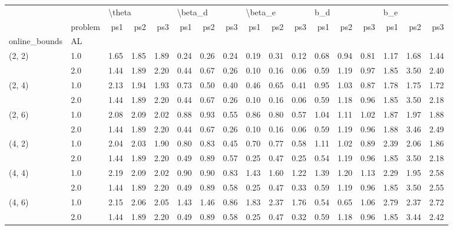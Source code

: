 \begin{tabular}{llrrrrrrrrrrrrrrr}
\toprule
       & {} & \multicolumn{3}{l}{\textbackslash theta} & \multicolumn{3}{l}{\textbackslash beta\_d} & \multicolumn{3}{l}{\textbackslash beta\_e} & \multicolumn{3}{l}{b\_d} & \multicolumn{3}{l}{b\_e} \\
       & problem &    ps1 &  ps2 &  ps3 &     ps1 &  ps2 &  ps3 &     ps1 &  ps2 &  ps3 &  ps1 &  ps2 &  ps3 &  ps1 &  ps2 &  ps3 \\
online\_bounds & AL &        &      &      &         &      &      &         &      &      &      &      &      &      &      &      \\
\midrule
(2, 2) & 1.0 &   1.65 & 1.85 & 1.89 &    0.24 & 0.26 & 0.24 &    0.19 & 0.31 & 0.12 & 0.68 & 0.94 & 0.81 & 1.17 & 1.68 & 1.44 \\
       & 2.0 &   1.44 & 1.89 & 2.20 &    0.44 & 0.67 & 0.26 &    0.10 & 0.16 & 0.06 & 0.59 & 1.19 & 0.97 & 1.85 & 3.50 & 2.40 \\
(2, 4) & 1.0 &   2.13 & 1.94 & 1.93 &    0.73 & 0.50 & 0.40 &    0.46 & 0.65 & 0.41 & 0.95 & 1.03 & 0.87 & 1.78 & 1.75 & 1.72 \\
       & 2.0 &   1.44 & 1.89 & 2.20 &    0.44 & 0.67 & 0.26 &    0.10 & 0.16 & 0.06 & 0.59 & 1.18 & 0.96 & 1.85 & 3.50 & 2.18 \\
(2, 6) & 1.0 &   2.08 & 2.09 & 2.02 &    0.88 & 0.93 & 0.55 &    0.86 & 0.80 & 0.57 & 1.04 & 1.11 & 1.02 & 1.87 & 1.97 & 1.88 \\
       & 2.0 &   1.44 & 1.89 & 2.20 &    0.44 & 0.67 & 0.26 &    0.10 & 0.16 & 0.06 & 0.59 & 1.19 & 0.96 & 1.88 & 3.46 & 2.49 \\
(4, 2) & 1.0 &   2.04 & 2.03 & 1.90 &    0.80 & 0.83 & 0.45 &    0.70 & 0.77 & 0.58 & 1.11 & 1.02 & 0.89 & 2.39 & 2.06 & 1.86 \\
       & 2.0 &   1.44 & 1.89 & 2.20 &    0.49 & 0.89 & 0.57 &    0.25 & 0.47 & 0.25 & 0.54 & 1.19 & 0.96 & 1.85 & 3.50 & 2.18 \\
(4, 4) & 1.0 &   2.19 & 2.09 & 2.02 &    0.90 & 0.90 & 0.83 &    1.43 & 1.60 & 1.22 & 1.39 & 1.20 & 1.13 & 2.29 & 1.95 & 2.58 \\
       & 2.0 &   1.44 & 1.89 & 2.20 &    0.49 & 0.89 & 0.58 &    0.25 & 0.47 & 0.33 & 0.59 & 1.19 & 0.96 & 1.85 & 3.50 & 2.55 \\
(4, 6) & 1.0 &   2.15 & 2.06 & 2.05 &    1.43 & 1.46 & 0.86 &    1.83 & 2.37 & 1.76 & 0.54 & 0.65 & 1.06 & 2.79 & 2.37 & 2.72 \\
       & 2.0 &   1.44 & 1.89 & 2.20 &    0.49 & 0.89 & 0.58 &    0.25 & 0.47 & 0.32 & 0.59 & 1.18 & 0.96 & 1.85 & 3.44 & 2.42 \\

\end{tabular}
